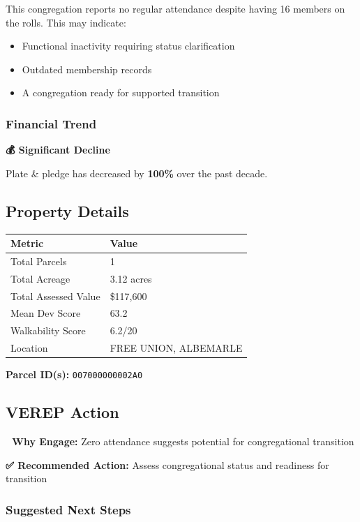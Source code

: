 \documentclass[
  letterpaper,
  DIV=11,
  numbers=noendperiod,
  oneside]{scrreprt}
\providecommand{\tightlist}{%
  \setlength{\itemsep}{0pt}\setlength{\parskip}{0pt}}
\begin{document}
This congregation reports no regular attendance despite having 16
members on the rolls. This may indicate:

\begin{itemize}
\tightlist
\item
  Functional inactivity requiring status clarification
\item
  Outdated membership records
\item
  A congregation ready for supported transition
\end{itemize}

\subsubsection{Financial Trend}\label{financial-trend-1}

\textbf{💰 Significant Decline}

Plate \& pledge has decreased by \textbf{100\%} over the past decade.

\subsection{Property Details}

\begin{longtable}[]{@{}ll@{}}
\toprule\noalign{}
Metric & Value \\
\midrule\noalign{}
\endhead
\bottomrule\noalign{}
\endlastfoot
Total Parcels & 1 \\
Total Acreage & 3.12 acres \\
Total Assessed Value & \$117,600 \\
Mean Dev Score & 63.2 \\
Walkability Score & 6.2/20 \\
Location & FREE UNION, ALBEMARLE \\
\end{longtable}

\textbf{Parcel ID(s):} \texttt{007000000002A0}

\subsection{VEREP Action}

\textbf{🎯 Why Engage:} Zero attendance suggests potential for
congregational transition

\textbf{✅ Recommended Action:} Assess congregational status and
readiness for transition

\subsubsection{Suggested Next Steps}\label{suggested-next-steps-1}
\end{document}
